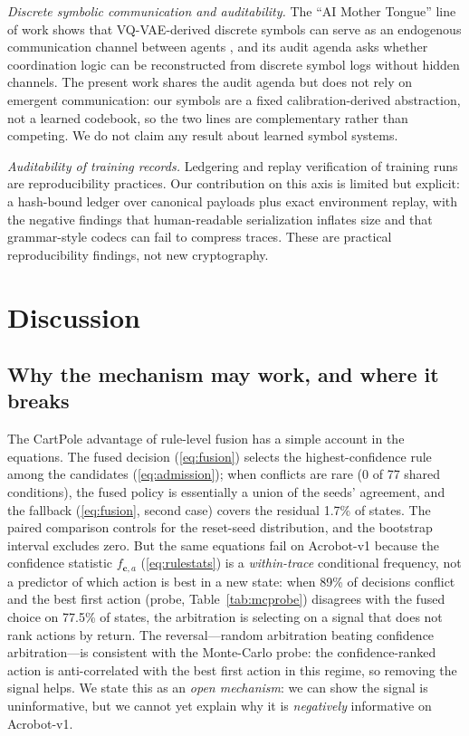 \documentclass[11pt]{article}
\begin{document}
\emph{Discrete symbolic communication and auditability.} The ``AI Mother Tongue'' line of work
shows that VQ-VAE-derived discrete symbols can serve as an endogenous communication channel between
agents \cite{liu2025aim}, and its audit agenda asks whether coordination logic can be reconstructed
from discrete symbol logs without hidden channels. The present work shares the audit agenda but
does not rely on emergent communication: our symbols are a fixed calibration-derived abstraction,
not a learned codebook, so the two lines are complementary rather than competing. We do not claim
any result about learned symbol systems.

\emph{Auditability of training records.} Ledgering and replay verification of training runs are
reproducibility practices. Our contribution on this axis is limited but explicit: a hash-bound
ledger over canonical payloads plus exact environment replay, with the negative findings that
human-readable serialization inflates size and that grammar-style codecs can fail to compress
traces. These are practical reproducibility findings, not new cryptography.

\section{Discussion}
\label{sec:discussion}

\subsection{Why the mechanism may work, and where it breaks}
\label{sec:discussion:mechanism}

The CartPole advantage of rule-level fusion has a simple account in the equations. The fused
decision (\ref{eq:fusion}) selects the highest-confidence rule among the candidates
(\ref{eq:admission}); when conflicts are rare (0 of 77 shared conditions), the fused policy is
essentially a union of the seeds' agreement, and the fallback (\ref{eq:fusion}, second case) covers
the residual 1.7\% of states. The paired comparison controls for the reset-seed distribution, and
the bootstrap interval excludes zero. But the same equations fail on Acrobot-v1 because the
confidence statistic $f_{\mathbf{c},a}$ (\ref{eq:rulestats}) is a \emph{within-trace} conditional
frequency, not a predictor of which action is best in a new state: when 89\% of decisions conflict
and the best first action (probe, Table~\ref{tab:mcprobe}) disagrees with the fused choice on
77.5\% of states, the arbitration is selecting on a signal that does not rank actions by return.
The reversal---random arbitration beating confidence arbitration---is consistent with the
Monte-Carlo probe: the confidence-ranked action is anti-correlated with the best first action in
this regime, so removing the signal helps. We state this as an \emph{open mechanism}: we can show
the signal is uninformative, but we cannot yet explain why it is \emph{negatively} informative on
Acrobot-v1.
\end{document}
